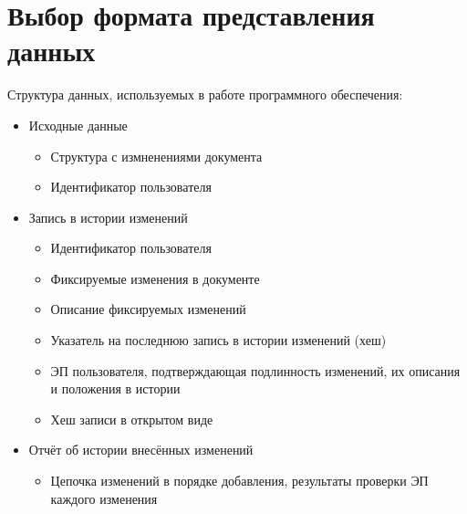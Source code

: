 \section{Выбор формата представления данных} \label{technologic_data}

Структура данных, используемых в работе программного обеспечения:
\begin{itemize}
	\item Исходные данные
	\begin{itemize}
		\item Структура с измненениями документа
		\item Идентификатор пользователя
	\end{itemize}
	\item Запись в истории изменений
	\begin{itemize}
		\item Идентификатор пользователя
		\item Фиксируемые изменения в документе
		\item Описание фиксируемых изменений
		\item Указатель на последнюю запись в истории изменений (хеш)
		\item ЭП пользователя, подтверждающая подлинность изменений, их описания и положения в истории
		\item Хеш записи в открытом виде
	\end{itemize}
	\item Отчёт об истории внесённых изменений
	\begin{itemize}
		\item Цепочка изменений в порядке добавления, результаты проверки ЭП каждого изменения
	\end{itemize}
\end{itemize}